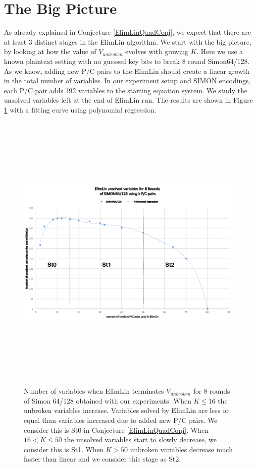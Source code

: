 \section{The Big Picture}
\label{BigPictureUpAndDown}

As already explained in
Conjecture \ref{ElimLinQuadConj}, we expect that there are at least 3 distinct stages in the ElimLin algorithm.
We start with the big picture, by looking at how the value of $V_{unbroken}$ evolves with growing $K$. Here we use a known plaintext setting with no guessed key bits to break 8 round Simon64/128. As we know, adding new P/C pairs to the ElimLin should create a linear growth in the total number of variables. In our experiment setup and SIMON encodings, each P/C pair adds 192 variables to the starting equation system. We study the unsolved variables left at the end of ElimLin run. The results are shown in Figure \ref{ElimLinUnrokenCurveUpDownSimon8} with a fitting curve using polynomial regression.

\begin{figure}[h!]
	\vspace{-0.2cm}
	\centering
	\includegraphics*[width=150mm,height=14cm]{./pics/Figure6-1.png}
	\caption[Number of variables when ElimLin terminates  $V_{unbroken}$
		for 8 rounds of Simon 64/128 obtained with our experiments.]{Number of variables when ElimLin terminates  $V_{unbroken}$
			for 8 rounds of Simon 64/128 obtained with our experiments.
		When $K \leq 16$ the unbroken variables increase. Variables solved by ElimLin are less or equal than variables increased due to added new P/C pairs. We consider this is St0 in
		Conjecture \ref{ElimLinQuadConj}. When $ 16 < K \leq 50 $ the unsolved variables start to slowly decrease, we consider this is St1. When $ K > 50 $ unbroken variables decrease much faster than linear and we consider this stage as St2.}
	\label{ElimLinUnrokenCurveUpDownSimon8}
	\vspace{-0.1cm}
\end{figure}

